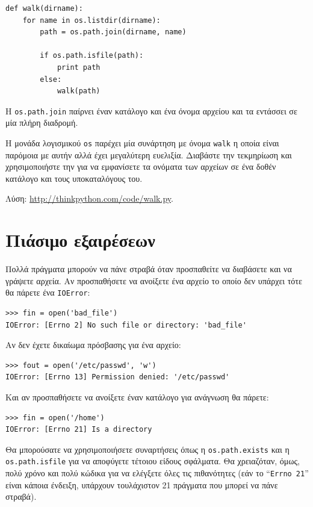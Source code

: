 \documentclass[10pt]{book}
\begin{document}
\begin{verbatim}
def walk(dirname):
    for name in os.listdir(dirname):
        path = os.path.join(dirname, name)

        if os.path.isfile(path):
            print path
        else:
            walk(path)
\end{verbatim}
%
Η {\tt os.path.join} παίρνει έναν κατάλογο και ένα όνομα αρχείου και τα εντάσσει σε μία πλήρη διαδρομή.
\\
\begin{exercise}

Η μονάδα λογισμικού {\tt os} παρέχει μία συνάρτηση με όνομα {\tt walk} η οποία είναι παρόμοια με αυτήν αλλά έχει μεγαλύτερη ευελιξία. Διαβάστε την τεκμηρίωση και χρησιμοποιήστε την για να εμφανίσετε τα ονόματα των αρχείων σε ένα δοθέν κατάλογο και τους υποκαταλόγους του.

Λύση: \url{http://thinkpython.com/code/walk.py}. 
\end{exercise}


\section{Πιάσιμο εξαιρέσεων}
\label{catch}

Πολλά πράγματα μπορούν να πάνε στραβά όταν προσπαθείτε να διαβάσετε και να γράψετε αρχεία. 
Αν προσπαθήσετε να ανοίξετε ένα αρχείο το οποίο δεν υπάρχει τότε θα πάρετε ένα  {\tt IOError}:

\begin{verbatim}
>>> fin = open('bad_file')
IOError: [Errno 2] No such file or directory: 'bad_file'
\end{verbatim}
%
Αν δεν έχετε δικαίωμα πρόσβασης για ένα αρχείο:

\begin{verbatim}
>>> fout = open('/etc/passwd', 'w')
IOError: [Errno 13] Permission denied: '/etc/passwd'
\end{verbatim}
%
Και αν προσπαθήσετε να ανοίξετε έναν κατάλογο για ανάγνωση θα πάρετε:

\begin{verbatim}
>>> fin = open('/home')
IOError: [Errno 21] Is a directory
\end{verbatim}
%
Θα μπορούσατε να χρησιμοποιήσετε συναρτήσεις όπως η {\tt os.path.exists}
και η {\tt os.path.isfile} για να αποφύγετε τέτοιου είδους σφάλματα. Θα χρειαζόταν, όμως, πολύ χρόνο και πολύ κώδικα για να ελέγξετε όλες τις πιθανότητες (εάν το ``{\tt Errno 21}'' είναι κάποια ένδειξη, υπάρχουν τουλάχιστον 21 πράγματα που μπορεί να πάνε στραβά).
\end{document}
